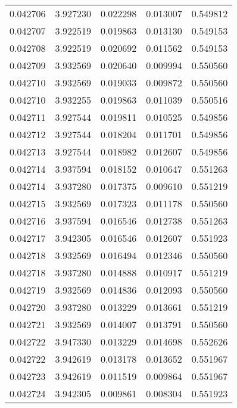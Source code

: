 \begin{tabular}{lrrrr}
0.042706    &  3.927230 &  0.022298 &  0.013007 &             0.549812 \\
0.042707    &  3.922519 &  0.019863 &  0.013130 &             0.549153 \\
0.042708    &  3.922519 &  0.020692 &  0.011562 &             0.549153 \\
0.042709    &  3.932569 &  0.020640 &  0.009994 &             0.550560 \\
0.042710    &  3.932569 &  0.019033 &  0.009872 &             0.550560 \\
0.042710    &  3.932255 &  0.019863 &  0.011039 &             0.550516 \\
0.042711    &  3.927544 &  0.019811 &  0.010525 &             0.549856 \\
0.042712    &  3.927544 &  0.018204 &  0.011701 &             0.549856 \\
0.042713    &  3.927544 &  0.018982 &  0.012607 &             0.549856 \\
0.042714    &  3.937594 &  0.018152 &  0.010647 &             0.551263 \\
0.042714    &  3.937280 &  0.017375 &  0.009610 &             0.551219 \\
0.042715    &  3.932569 &  0.017323 &  0.011178 &             0.550560 \\
0.042716    &  3.937594 &  0.016546 &  0.012738 &             0.551263 \\
0.042717    &  3.942305 &  0.016546 &  0.012607 &             0.551923 \\
0.042718    &  3.932569 &  0.016494 &  0.012346 &             0.550560 \\
0.042718    &  3.937280 &  0.014888 &  0.010917 &             0.551219 \\
0.042719    &  3.932569 &  0.014836 &  0.012093 &             0.550560 \\
0.042720    &  3.937280 &  0.013229 &  0.013661 &             0.551219 \\
0.042721    &  3.932569 &  0.014007 &  0.013791 &             0.550560 \\
0.042722    &  3.947330 &  0.013229 &  0.014698 &             0.552626 \\
0.042722    &  3.942619 &  0.013178 &  0.013652 &             0.551967 \\
0.042723    &  3.942619 &  0.011519 &  0.009864 &             0.551967 \\
0.042724    &  3.942305 &  0.009861 &  0.008304 &             0.551923 \\

\end{tabular}
